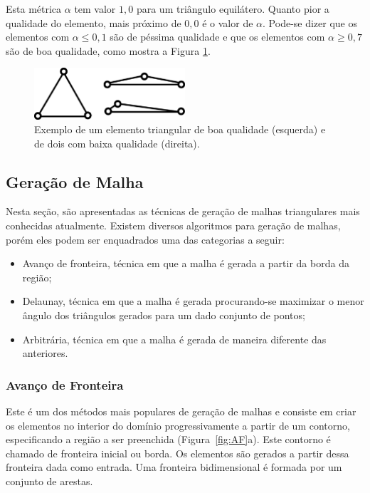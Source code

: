 Esta métrica $\alpha$ tem valor $1,0$ para um triângulo equilátero. Quanto pior a qualidade do elemento, mais próximo de $0,0$ é o valor de $\alpha$. Pode-se dizer que os elementos com $\alpha \leq 0,1$ são de péssima qualidade e que os elementos com $\alpha \geq 0,7$ são de boa qualidade, como mostra a Figura \ref{fig:qualidade_elemento}.

 \begin{figure}[htbp]
     \centering
     \includegraphics[width=0.5\textwidth]{fig/qualidade_elemento.png}
     \caption{Exemplo de um elemento triangular de boa qualidade (esquerda) e de dois com baixa qualidade (direita).} 
     \label{fig:qualidade_elemento}
 \end{figure}

\subsection{Geração de Malha}\label{Geração de Malha}

Nesta seção, são apresentadas as técnicas de geração de malhas triangulares mais conhecidas atualmente. Existem diversos algoritmos para geração de malhas, porém eles podem ser enquadrados uma das categorias a seguir:

\begin{itemize}
  \item Avanço de fronteira, técnica em que a malha é gerada a partir da borda da região;

  \item Delaunay, técnica em que a malha é gerada procurando-se maximizar o menor ângulo dos triângulos gerados para um dado conjunto de pontos;

  \item Arbitrária, técnica em que a malha é gerada de maneira diferente das anteriores.
\end{itemize}

\subsubsection{Avanço de Fronteira}

Este é um dos métodos mais populares de geração de malhas e consiste em criar os elementos no interior do domínio progressivamente a partir de um contorno, especificando a região a ser preenchida (Figura~\ref{fig:AF}a). Este contorno é chamado de fronteira inicial ou borda. Os elementos são gerados a partir dessa fronteira dada como entrada. Uma fronteira bidimensional é formada por um conjunto de arestas.

